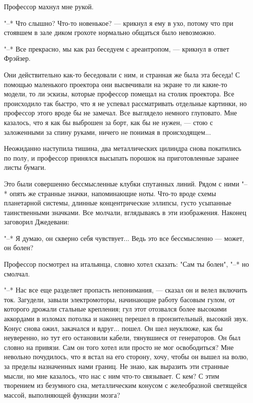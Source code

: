 Профессор махнул мне рукой.

"--* Что слышно? Что-то новенькое? --- крикнул я ему в ухо, потому  что  при
стоявшем в зале диком грохоте нормально общаться было невозможно.

"--* Все прекрасно, мы как раз беседуем с ареантропом, --- крикнул  в  ответ
Фрэйзер.

Они действительно как-то беседовали с  ним,  и  странная  же  была  эта
беседа! С помощью маленького проектора они высвечивали  на  экране  то  ли
какие-то модели,  то  ли  эскизы,  которые  профессор  помещал  на  столик
проектора. Все происходило так быстро,  что  я  не  успевал  рассматривать
отдельные картинки, но профессор этого вроде бы не замечал. Все  выглядело
немного глуповато. Мне казалось, что я как бы выброшен за борт, как бы  не
нужен, ---  стою  с  заложенными  за  спину  руками,  ничего  не  понимая  в
происходящем...

Неожиданно  наступила  тишина,   два   металлических   цилиндра   снова
покатились  по  полу,   и   профессор   принялся   высыпать   порошок   на
приготовленные заранее листы бумаги.

Это были совершенно бессмысленные клубки спутанных линий. Рядом с  ними
"--*  опять  же  странные  значки,  напоминающие  ноты.  Что-то  вроде  схемы
планетарной системы,  длинные  концентрические  эллипсы,  густо  усыпанные
таинственными  значками.  Все  молчали,  вглядываясь  в  эти  изображения.
Наконец заговорил Джедевани:

"--* Я думаю, он скверно себя чувствует... Ведь  это  все  бессмысленно  ---
может, он болен?

Профессор посмотрел на итальянца, словно хотел сказать: "Сам ты болен",
"--* но смолчал.

"--* Нас все еще разделяет пропасть  непонимания,  ---  сказал  он  и  велел
включить ток. Загудели, завыли электромоторы,  начинающие  работу  басовым
гулом, от которого дрожали стальные крепления; гул  этот  отозвался  более
высокими аккордами в изломах потолка и наконец  перешел  в  пронзительный,
высокий звук. Конус  снова  ожил,  закачался  и  вдруг...  пошел.  Он  шел
неуклюже, как бы неуверенно, но тут его остановили кабели,  тянувшиеся  от
генераторов. Он был словно на привязи. Сам он того хотел или просто не мог
освободиться? Мне невольно почудилось, что я встал на его  сторону,  хочу,
чтобы он вышел на волю, за пределы назначенных нами границ. Не  знаю,  как
выразить эти странные мысли,  но  мне  казалось,  что  нас  с  ним  что-то
связывает. С кем? С этим творением из безумного сна, металлическим конусом
с желеобразной светящейся массой, выполняющей функции мозга?

